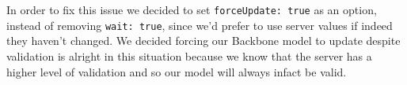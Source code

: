 In order to fix this issue we decided to set \verb!forceUpdate: true! as an option, instead of removing \verb!wait: true!, since we'd prefer to use server values if indeed they haven't changed. We decided forcing our Backbone model to update despite validation is alright in this situation because we know that the server has a higher level of validation and so our model will always infact be valid.

